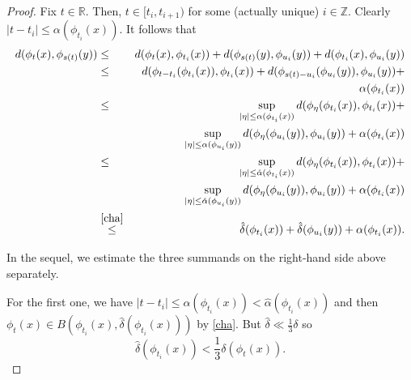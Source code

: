 \documentclass[11pt,letterpaper]{amsart}
\begin{document}
\begin{proof}
Fix $t\in\mathbb{R}$. Then, $t\in [t_i,t_{i+1})$ for some (actually unique) $i\in\mathbb{Z}$. Clearly $|t-t_i|\leq \alpha(\phi_{t_i}(x))$.
It follows that
\begin{eqnarray}
\label{perra}
d(\phi_t(x),\phi_{s(t)}(y))&\leq& d(\phi_t(x),\phi_{t_i}(x))+d(\phi_{s(t)}(y),\phi_{u_i}(y))+ d(\phi_{t_i}(x),\phi_{u_i}(y))\\
\notag &\leq& d(\phi_{t-t_i}(\phi_{t_i}(x)),\phi_{t_i}(x))+d(\phi_{s(t)-u_i}(\phi_{u_i}(y)),\phi_{u_i}(y))+\\
\notag & & \alpha(\phi_{t_i}(x))\\
\notag &\leq& \sup_{|\eta|\leq \alpha(\phi_{t_i}(x))}d(\phi_\eta(\phi_{t_i}(x)),\phi_{t_i}(x))+\\
\notag & & \sup_{|\eta|\leq \alpha(\phi_{u_i}(y))}d(\phi_\eta(\phi_{u_i}(y)),\phi_{u_i}(y))+\alpha(\phi_{t_i}(x))\\
\notag &\leq& \sup_{|\eta|\leq \hat{\alpha}(\phi_{t_i}(x))}d(\phi_\eta(\phi_{t_i}(x)),\phi_{t_i}(x))+\\
\notag & & \sup_{|\eta|\leq \hat{\alpha}(\phi_{u_i}(y))}d(\phi_\eta(\phi_{u_i}(y)),\phi_{u_i}(y))+\alpha(\phi_{t_i}(x))\\
\notag &\overset{\eqref{cha}}{\leq}& \hat{\delta}(\phi_{t_i}(x))+ \hat{\delta}(\phi_{u_i}(y))+\alpha(\phi_{t_i}(x)).
\end{eqnarray}

In the sequel, we estimate the three summands on the right-hand side above separately.

For the first one, we have $|t-t_i|\leq \alpha(\phi_{t_i}(x))<\hat{\alpha}(\phi_{t_i}(x))$ and then $\phi_t(x)\in B(\phi_{t_i}(x),\hat{\delta}(\phi_{t_i}(x)))$ by \eqref{cha}.
But $\hat{\delta}\ll \frac{1}3\delta$ so
\begin{equation}
\label{perro}
\hat{\delta}(\phi_{t_i}(x))<\frac{1}3\delta(\phi_t(x)).
\end{equation}


\end{proof}
\end{document}
